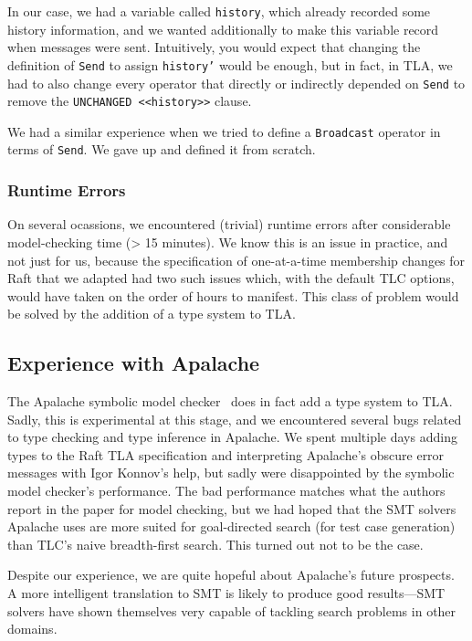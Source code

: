 \documentclass[a4paper]{article}
\begin{document}
In our case, we had a variable called \texttt{history}, which already recorded some history information, and we wanted additionally to make this variable record when messages were sent.
%
Intuitively, you would expect that changing the definition of \texttt{Send} to assign \texttt{history'} would be enough, but in fact, in TLA, we had to also change every operator that directly or indirectly depended on \texttt{Send} to remove the \texttt{UNCHANGED <<history>>} clause.

We had a similar experience when we tried to define a \texttt{Broadcast} operator in terms of \texttt{Send}.
%
We gave up and defined it from scratch.

\subsubsection{Runtime Errors}

On several ocassions, we encountered (trivial) runtime errors after considerable model-checking time (> 15 minutes).
%
We know this is an issue in practice, and not just for us, because the specification of one-at-a-time membership changes for Raft that we adapted had two such issues which, with the default TLC options, would have taken on the order of hours to manifest.
%
This class of problem would be solved by the addition of a type system to TLA.

\subsection{Experience with Apalache}

The Apalache symbolic model checker~\cite{konnov_tla+_2019} does in fact add a type system to TLA.
%
Sadly, this is experimental at this stage, and we encountered several bugs related to type checking and type inference in Apalache.
%
We spent multiple days adding types to the Raft TLA specification and interpreting Apalache's obscure error messages with Igor Konnov's help, but sadly were disappointed by the symbolic model checker's performance.
%
The bad performance matches what the authors report in the paper for model checking, but we had hoped that the SMT solvers Apalache uses are more suited for goal-directed search (for test case generation) than TLC's naive breadth-first search.
%
This turned out not to be the case.

Despite our experience, we are quite hopeful about Apalache's future prospects.
%
A more intelligent translation to SMT is likely to produce good results---SMT solvers have shown themselves very capable of tackling search problems in other domains.
\end{document}
